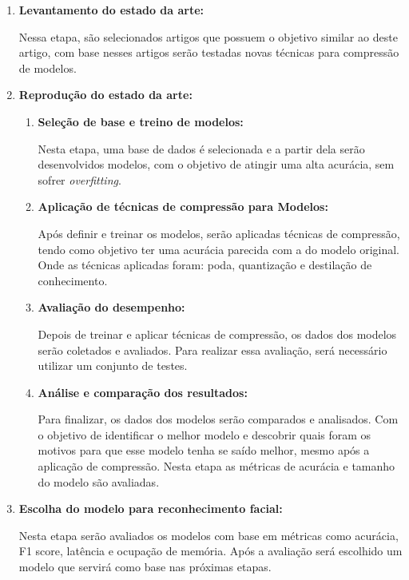 \begin{enumerate}
	\item \textbf{Levantamento do estado da arte:}

		Nessa etapa, são selecionados artigos que possuem o objetivo similar ao deste artigo,
		com base nesses artigos serão testadas novas técnicas para compressão de modelos.

	\item \textbf{Reprodução do estado da arte:}

	\begin{enumerate}
		\item \textbf{Seleção de base e treino de modelos:}

			Nesta etapa, uma base de dados é selecionada e a partir dela serão desenvolvidos modelos,
			com o objetivo de atingir uma alta acurácia, sem sofrer \textit{overfitting}.

		\item \textbf{Aplicação de técnicas de compressão para Modelos:}

			Após definir e treinar os modelos, serão aplicadas técnicas de compressão, tendo como
			objetivo ter uma acurácia parecida com a do modelo original. Onde as técnicas aplicadas
			foram: poda, quantização e destilação de conhecimento.

		\item \textbf{Avaliação do desempenho:}

			Depois de treinar e aplicar técnicas de compressão, os dados dos modelos serão coletados e
			avaliados. Para realizar essa avaliação, será necessário utilizar um conjunto de testes.

		\item \textbf{Análise e comparação dos resultados:}

			Para finalizar, os dados dos modelos serão comparados e analisados. Com o objetivo de
			identificar o melhor modelo e descobrir quais foram os motivos para que esse modelo tenha se
			saído melhor, mesmo após a aplicação de compressão. Nesta etapa as métricas de acurácia e
			tamanho do modelo são avaliadas.
	\end{enumerate}

	\item \textbf{Escolha do modelo para reconhecimento facial:}

		Nesta etapa serão avaliados os modelos com base em métricas como acurácia, F1 score, latência e ocupação de
		memória. Após a avaliação será escolhido um modelo que servirá como base nas próximas etapas.


\end{enumerate}
